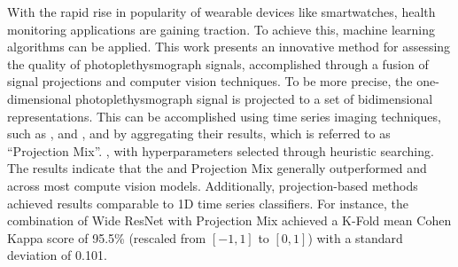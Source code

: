 
With the rapid rise in popularity of wearable devices like smartwatches, health monitoring applications are gaining traction. 
%
To achieve this, machine learning algorithms can be applied. This work presents an innovative method for assessing the quality of photoplethysmograph signals, accomplished through a fusion of signal projections and computer vision techniques. To be more precise, the one-dimensional photoplethysmograph signal is projected to a set of bidimensional representations. This can be accomplished using time series imaging techniques, such as ,  and , and by aggregating their results, which is referred to as ``Projection Mix''. , with hyperparameters selected through heuristic searching. The results indicate that the  and Projection Mix generally outperformed  and  across most compute vision models. Additionally, projection-based methods achieved results comparable to 1D time series classifiers. For instance, the combination of Wide ResNet with Projection Mix achieved a K-Fold mean Cohen Kappa score of 95.5\% (rescaled from $[-1,1]$ to $[0,1]$) with a standard deviation of 0.101. 
